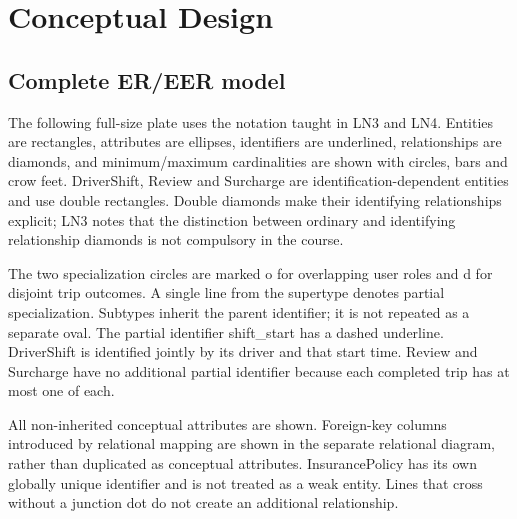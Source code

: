 \documentclass[11pt,a4paper]{article}
\begin{document}
\clearpage

\clearpage


\clearpage
\section{Conceptual Design}
\subsection{Complete ER/EER model}
The following full-size plate uses the notation taught in LN3 and LN4. Entities are rectangles, attributes are ellipses, identifiers are underlined, relationships are diamonds, and minimum/maximum cardinalities are shown with circles, bars and crow feet. DriverShift, Review and Surcharge are identification-dependent entities and use double rectangles. Double diamonds make their identifying relationships explicit; LN3 notes that the distinction between ordinary and identifying relationship diamonds is not compulsory in the course.

The two specialization circles are marked o for overlapping user roles and d for disjoint trip outcomes. A single line from the supertype denotes partial specialization. Subtypes inherit the parent identifier; it is not repeated as a separate oval. The partial identifier shift\_\allowbreak{}start has a dashed underline. DriverShift is identified jointly by its driver and that start time. Review and Surcharge have no additional partial identifier because each completed trip has at most one of each.

All non-inherited conceptual attributes are shown. Foreign-key columns introduced by relational mapping are shown in the separate relational diagram, rather than duplicated as conceptual attributes. InsurancePolicy has its own globally unique identifier and is not treated as a weak entity. Lines that cross without a junction dot do not create an additional relationship.
\end{document}
